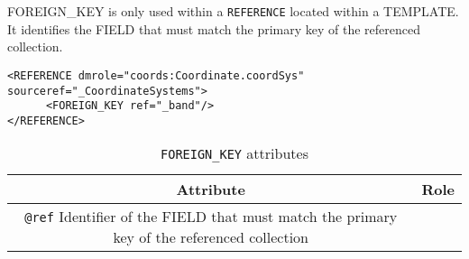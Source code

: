 FOREIGN\_KEY is only used within a \texttt{REFERENCE} located within a TEMPLATE.
It identifies the FIELD that must  match the primary key of the referenced collection.

\begin{lstlisting}[frame=single,caption={The \texttt{REFERENCE} is resolved by the \texttt{INSTANCE} of table \_CoordinateSystems that has a primary key equals to the value of the column  \_band},style=XML,basicstyle=\tiny]
<REFERENCE dmrole="coords:Coordinate.coordSys" sourceref="_CoordinateSystems">
      <FOREIGN_KEY ref="_band"/>
</REFERENCE>
\end{lstlisting}

\begin{table}[!htbp]
\small
\centering
\begin{tabulary}{\linewidth}{|c|J|}       
       \hline 
            \textbf{Attribute} & 
            \textbf {Role}\\
       \hline         \hline  
             \texttt{@ref}  
             Identifier of the FIELD that must  match the primary key of the referenced collection & \\
     \hline
     \end{tabulary}
     \caption{\texttt{FOREIGN\_KEY} attributes} 
     \label{tbl:foreignkey-att}
 \end{table}
